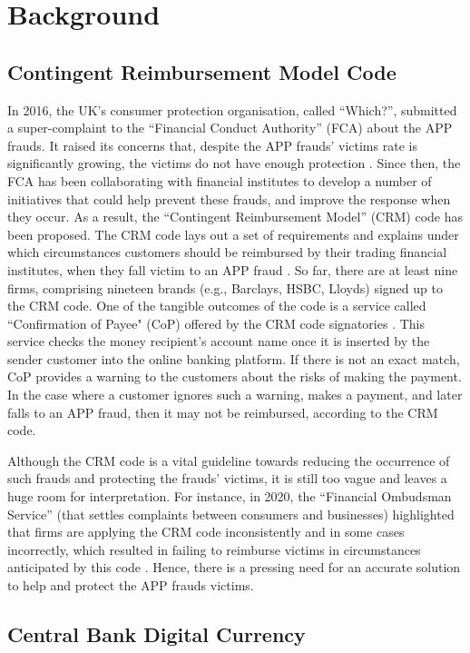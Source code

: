 
\section{Background}


\subsection{Contingent Reimbursement Model Code}

In  2016, the UK's consumer protection organisation, called ``Which?'', submitted a super-complaint to the ``Financial Conduct Authority'' (FCA) about the APP frauds. It raised its concerns that, despite the APP frauds' victims rate is significantly growing, the victims do not have enough protection \cite{Which?-super-complaint}.  Since then, the FCA has been collaborating with financial institutes  to develop a number of initiatives that
could help prevent these frauds, and improve the response when they  occur. As a result,  the ``Contingent Reimbursement Model'' (CRM) code has been proposed. The  CRM code  lays out a set of requirements and explains under which circumstances customers should be reimbursed by their trading financial institutes, when they fall victim to an APP fraud \cite{CRM-code}. So far,  there are at least nine firms, comprising nineteen brands (e.g., Barclays, HSBC,  Lloyds) signed up to the CRM code. One of the tangible outcomes of the code is a service called ``Confirmation of Payee" (CoP)  offered by the CRM code signatories \cite{CoP}. This service checks the money recipient's account name once it is inserted by the sender customer into the online banking platform. If there is not an exact match, CoP provides a warning to the  customers about the risks of making the payment. In the case where a customer ignores such a warning, makes a payment, and later falls to an APP fraud, then it may not be reimbursed, according to the CRM code.

Although the CRM code is a vital guideline  towards reducing the occurrence of such frauds and protecting  the frauds' victims, it is still too vague and leaves a huge room for interpretation. For instance, in 2020, the ``Financial Ombudsman Service'' (that settles complaints between consumers and businesses)  highlighted that firms  are applying the CRM code inconsistently and in some cases incorrectly, which resulted in failing to reimburse victims in circumstances anticipated by this code \cite{Financial-Ombudsman-Service-response}. Hence, there is a pressing need for an accurate solution to help and protect the APP frauds victims. 

\subsection{Central Bank Digital Currency}